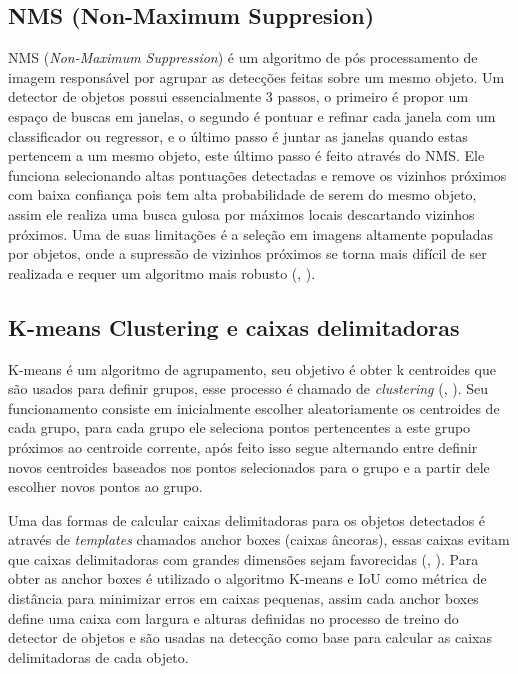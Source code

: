 \documentclass[]{politex}
\begin{document}
\subsection{NMS (Non-Maximum Suppresion)}
NMS (\textit{Non-Maximum Suppression}) é um algoritmo de pós processamento de imagem responsável por agrupar as detecções feitas sobre um mesmo objeto. Um detector de objetos possui essencialmente 3 passos, o primeiro é propor um espaço de buscas em janelas, o segundo é pontuar e refinar cada janela com um classificador ou regressor, e o último passo é juntar as janelas quando estas pertencem a um mesmo objeto, este último passo é feito através do NMS. Ele funciona selecionando altas pontuações detectadas e remove os vizinhos próximos com baixa confiança pois tem alta probabilidade de serem do mesmo objeto, assim ele realiza uma busca gulosa por máximos locais descartando vizinhos próximos. Uma de suas limitações é a seleção em imagens altamente populadas por objetos, onde a supressão de vizinhos próximos se torna mais difícil de ser realizada e requer um algoritmo mais robusto (, \citeyear{nms}).

\subsection{K-means Clustering e caixas delimitadoras}
K-means é um algoritmo de agrupamento, seu objetivo é obter k centroides que são usados para definir grupos, esse processo é chamado de \textit{clustering} (, \citeyear{kmeans}). Seu funcionamento consiste em inicialmente escolher aleatoriamente os centroides de cada grupo, para cada grupo ele seleciona pontos pertencentes a este grupo próximos ao centroide corrente, após feito isso segue alternando entre definir novos centroides baseados nos pontos selecionados para o grupo e a partir dele escolher novos pontos ao grupo.

Uma das formas de calcular caixas delimitadoras para os objetos detectados é através de \textit{templates} chamados anchor boxes (caixas âncoras), essas caixas evitam que caixas delimitadoras com grandes dimensões sejam favorecidas (, \citeyear{boundingbox}). Para obter as anchor boxes é utilizado o algoritmo K-means e IoU como métrica de distância para minimizar erros em caixas pequenas, assim cada anchor boxes define uma caixa com largura e alturas definidas no processo de treino do detector de objetos e são usadas na detecção como base para calcular as caixas delimitadoras de cada objeto.
\end{document}
